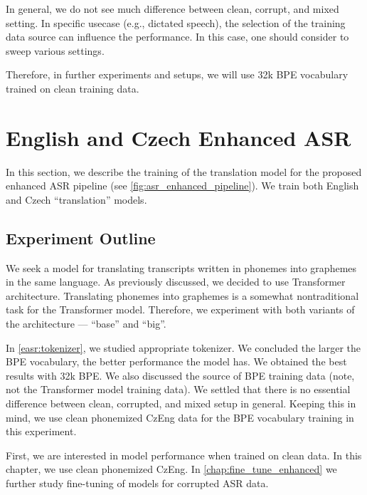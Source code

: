 In general, we do not see much difference between clean, corrupt, and mixed setting. In specific usecase (e.g., dictated speech), the selection of the training data source can influence the performance. In this case, one should consider to sweep various settings.

Therefore, in further experiments and setups, we will use 32k BPE vocabulary trained on clean training data.









\section{English and Czech Enhanced ASR}
\label{easr:english}
In this section, we describe the training of the translation model for the proposed enhanced ASR pipeline (see \cref{fig:asr_enhanced_pipeline}). We train both English and Czech ``translation'' models.

\subsection{Experiment Outline}
\label{easr:outline}
We seek a model for translating transcripts written in phonemes into graphemes in the same language. As previously discussed, we decided to use Transformer architecture. Translating phonemes into graphemes is a somewhat nontraditional task for the Transformer model. Therefore, we experiment with both variants of the architecture --- ``base'' and ``big''. 

In \cref{easr:tokenizer}, we studied appropriate tokenizer. We concluded the larger the BPE vocabulary, the better performance the model has. We obtained the best results with 32k BPE. We also discussed the source of BPE training data (note, not the Transformer model training data). We settled that there is no essential difference between clean, corrupted, and mixed setup in general. Keeping this in mind, we use clean phonemized CzEng data for the BPE vocabulary training in this experiment. 

First, we are interested in model  performance when trained on clean data. In this chapter, we use clean phonemized CzEng. In \cref{chap:fine_tune_enhanced} we further study fine-tuning of models for corrupted ASR data.


